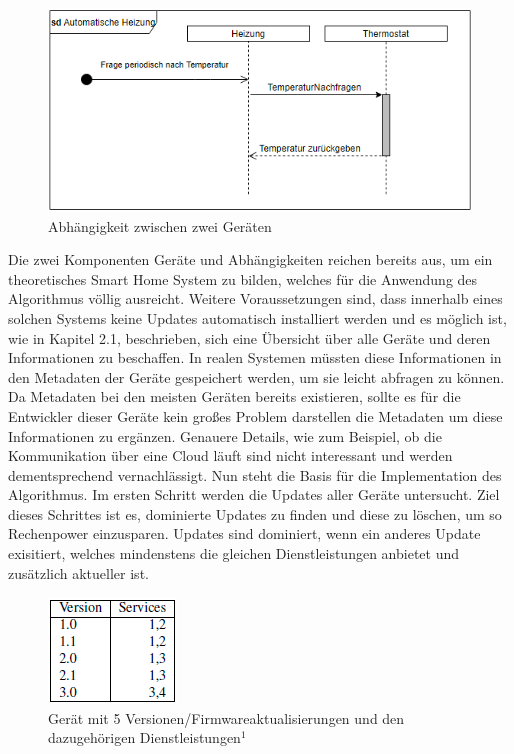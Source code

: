 \begin{figure}[h]
\centering
\includegraphics{"Heizung"}
\caption{Abhängigkeit zwischen zwei Geräten}
\label{fig:Prob1:MEA}
\end{figure}
\newpage
Die zwei Komponenten Geräte und Abhängigkeiten reichen bereits aus, um ein theoretisches Smart Home System zu bilden, welches für die Anwendung
des Algorithmus völlig ausreicht. Weitere Voraussetzungen sind, dass innerhalb eines solchen Systems keine Updates automatisch
installiert werden und es möglich ist, wie in Kapitel 2.1, beschrieben, sich eine Übersicht über alle Geräte und deren Informationen zu
beschaffen. In realen Systemen müssten diese Informationen in den Metadaten der Geräte
gespeichert werden, um sie leicht abfragen zu können. Da Metadaten bei den meisten
Geräten bereits existieren, sollte es für die Entwickler dieser Geräte kein großes Problem darstellen die Metadaten
um diese Informationen zu ergänzen. Genauere Details, wie zum Beispiel, ob die Kommunikation über eine Cloud läuft sind nicht
interessant und werden dementsprechend vernachlässigt.
Nun steht die Basis für die Implementation des Algorithmus. Im ersten Schritt werden die Updates aller Geräte untersucht. 
Ziel dieses Schrittes ist es, dominierte Updates zu finden und diese zu löschen, um so Rechenpower einzusparen. Updates sind dominiert,
wenn ein anderes Update exisitiert, welches mindenstens die gleichen Dienstleistungen anbietet und zusätzlich aktueller ist.

\begin{figure}[h]
\begin{center}
\includegraphics{"Versions"}
\caption{Gerät mit 5 Versionen/Firmwareaktualisierungen und den dazugehörigen Dienstleistungen\( ^1\)}
\label{fig:Prob1:MEA}
\end{center}
\end{figure}

